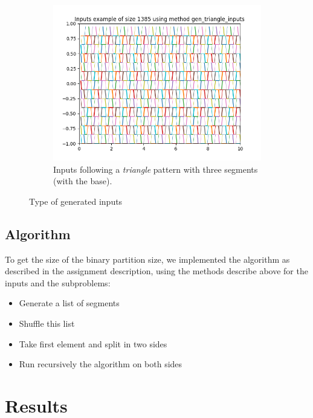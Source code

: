 \documentclass[letterpaper]{article}
\begin{document}
\begin{figure}[H]
\begin{subfigure}{.5\textwidth}
      \centering
      \includegraphics[width=1\linewidth]{images/assign1/gen_inputs_fulltriangle}
      \caption{Inputs following a \textit{triangle} pattern with three segments (with the base).}
      \label{fig:full_triangle_inputs}
    \end{subfigure}
    \caption{Type of generated inputs}
    \label{fig:inputs}
\end{figure}

\subsection{Algorithm}

To get the size of the binary partition size, we implemented the algorithm as described
in the assignment description, using the methods describe above for the inputs and
the subproblems:

\begin{itemize}
  \item Generate a list of segments
  \item Shuffle this list
  \item Take first element and split in two sides
  \item Run recursively the algorithm on both sides
\end{itemize}


\section{Results}

\paragraph{}
\end{document}
